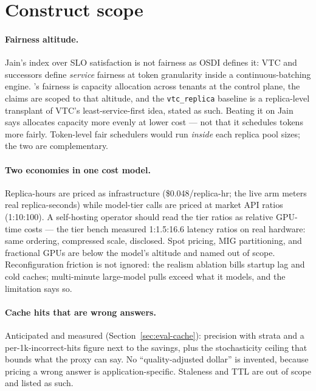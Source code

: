 \section{Construct scope}

\paragraph{Fairness altitude.}
\label{sec:disc-fairness-altitude}
Jain's index over SLO satisfaction is not fairness as OSDI defines it: VTC
and successors define \emph{service} fairness at token granularity inside a
continuous-batching engine. \polyforge{}'s fairness is capacity allocation
across tenants at the control plane, the claims are scoped to that altitude,
and the \texttt{vtc\_replica} baseline is a replica-level transplant of
VTC's least-service-first idea, stated as such. Beating it on Jain says
\polyforge{} allocates capacity more evenly at lower cost --- not that it
schedules tokens more fairly. Token-level fair schedulers would run
\emph{inside} each replica pool \polyforge{} sizes; the two are
complementary.

\paragraph{Two economies in one cost model.} Replica-hours are priced as
infrastructure (\$0.048/replica-hr; the live arm meters real
replica-seconds) while model-tier calls are priced at market API ratios
(1:10:100). A self-hosting operator should read the tier ratios as relative
GPU-time costs --- the tier bench measured 1:1.5:16.6 latency ratios on real
hardware: same ordering, compressed scale, disclosed. Spot pricing, MIG
partitioning, and fractional GPUs are below the model's altitude and named
out of scope. Reconfiguration friction is not ignored: the realism ablation
bills startup lag and cold caches; multi-minute large-model pulls exceed
what it models, and the limitation says so.

\paragraph{Cache hits that are wrong answers.} Anticipated and measured
(Section~\ref{sec:eval-cache}): precision with strata and a
per-1k-incorrect-hits figure next to the savings, plus the stochasticity
ceiling that bounds what the proxy can say. No ``quality-adjusted dollar''
is invented, because pricing a wrong answer is application-specific.
Staleness and TTL are out of scope and listed as such.

